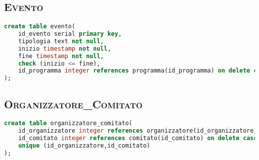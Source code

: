 \subsection{\textsc{Evento}}
\begin{lstlisting}[language=SQL,style=mystyle, caption={Tabella: Evento}]
create table evento(
    id_evento serial primary key,
    tipologia text not null,
    inizio timestamp not null,
    fine timestamp not null,
    check (inizio <= fine), 
    id_programma integer references programma(id_programma) on delete cascade not null
);
\end{lstlisting}
\subsection{\textsc{Organizzatore\_Comitato}}
\begin{lstlisting}[language=SQL,style=mystyle, caption={Tabella: Organizzatore\_Comitato}]
create table organizzatore_comitato(
    id_organizzatore integer references organizzatore(id_organizzatore) on delete cascade,
    id_comitato integer references comitato(id_comitato) on delete cascade,
    unique (id_organizzatore,id_comitato) 
);
\end{lstlisting}